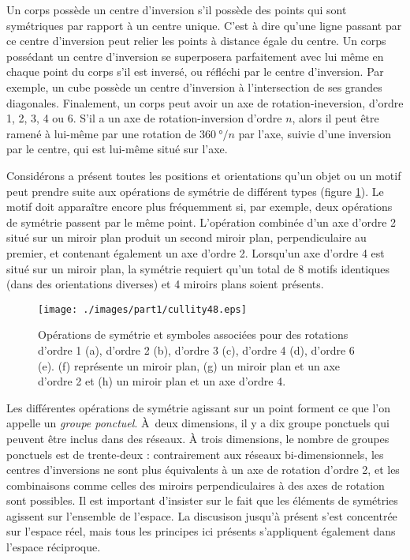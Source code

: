 Un corps possède un centre d'inversion s'il possède des points qui sont symétriques
par rapport à un centre unique. C'est à dire qu'une ligne passant par ce centre d'inversion
peut relier les points à distance égale du centre.
Un corps possédant un centre d'inversion se superposera parfaitement avec lui
même en chaque point du corps s'il est inversé, ou réfléchi par le centre
d'inversion. Par exemple, un cube possède un centre d'inversion à l'intersection de ses grandes
diagonales.
Finalement, un corps peut avoir un axe de rotation-ineversion, d'ordre 1, 2, 3, 4
ou 6. S'il a un axe de rotation-inversion d'ordre $n$, alors il peut être ramené à
lui-même par une rotation de $\SI{360}{\degree}/n$ par l'axe, suivie d'une inversion par le
centre, qui est lui-même situé sur l'axe.

Considérons a présent toutes les positions et orientations qu'un objet ou un
motif peut prendre suite aux opérations de symétrie de différent types (figure
\ref{cullity9}). Le motif doit apparaître encore plus fréquemment si, par
exemple, deux opérations de symétrie passent par le même point. L'opération
combinée d'un axe d'ordre 2 situé sur un miroir plan produit un second miroir
plan, perpendiculaire au premier, et contenant également un axe d'ordre 2.
Lorsqu'un axe d'ordre 4 est situé sur un miroir plan, la symétrie requiert qu'un
total de 8 motifs identiques (dans des orientations diverses) et 4 miroirs plans
soient présents.

\begin{figure}
    \texttt{[image: ./images/part1/cullity48.eps]}
    \caption{Opérations de symétrie et symboles associées pour des rotations
        d'ordre 1 (a), d'ordre 2 (b), d'ordre 3 (c), d'ordre 4 (d), d'ordre 6
        (e). (f) représente un miroir plan, (g) un miroir plan et un axe d'ordre
    2 et (h) un miroir plan et un axe d'ordre 4.}
    \label{cullity9}
\end{figure}

Les différentes opérations de symétrie agissant sur un point forment ce que l'on appelle un
\emph{groupe ponctuel}. À deux dimensions, il y a dix groupe ponctuels qui
peuvent être inclus dans des réseaux. À trois dimensions, le nombre de groupes
ponctuels est de trente-deux : contrairement aux réseaux bi-dimensionnels, les
centres d'inversions ne sont plus équivalents à un axe de rotation d'ordre 2, et
les combinaisons comme celles des miroirs perpendiculaires à des axes de rotation
sont possibles.
Il est important d'insister sur le fait que les éléments de symétries agissent
sur l'ensemble de l'espace. La discusison jusqu'à présent s'est concentrée sur
l'espace réel, mais tous les principes ici présents s'appliquent également dans
l'espace réciproque.


